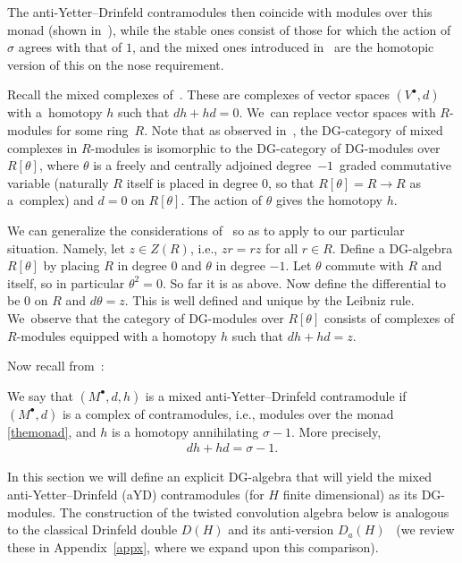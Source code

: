 \documentclass[11pt]{article}
\numberwithin{equation}{section}
\numberwithin{equation}{section}
\begin{document}
The anti-Yetter--Drinfeld contramodules then coincide with modules over this monad (shown in~\cite{chern}), while the stable ones consist of those for which the action of $\sigma$ agrees with that of $1$, and the mixed ones introduced in~\cite{chern} are the homotopic version of this on the nose requirement.

Recall the mixed complexes of~\cite{kassel}. These are complexes of vector spaces $(V^\bullet,d)$ with a~homo\-topy $h$ such that $dh+hd=0$. We~can replace vector spaces with $R$-modules for some ring~$R$. Note that as observed in~\cite{kassel}, the DG-category of mixed complexes in $R$-modules is isomorphic to the DG-category of DG-modules over $R[\theta]$, where $\theta$ is a freely and centrally adjoined degree~$-1$~graded commutative variable (naturally $R$ itself is placed in degree $0$, so that $R[\theta]=R\to R$ as a~comp\-lex) and $d=0$ on $R[\theta]$. The action of $\theta$ gives the homotopy $h$.

We can generalize the considerations of~\cite{kassel} so as to apply to our particular situation. Namely, let $z\in Z(R)$, i.e., $zr=rz$ for all $r\in R$. Define a DG-algebra $R[\theta]$ by placing $R$ in degree $0$ and $\theta$ in degree $-1$. Let $\theta$ commute with $R$ and itself, so in particular $\theta^2=0$. So far it is as above. Now define the differential to be $0$ on $R$ and $d\theta=z$. This is well defined and unique by the Leibniz rule. We~observe that the category of DG-modules over $R[\theta]$ consists of complexes of $R$-modules equipped with a homotopy $h$ such that $dh+hd=z$.

Now recall from~\cite{chern}:

\begin{Definition}
We say that $(M^\bullet,d,h)$ is a mixed anti-Yetter--Drinfeld contramodule if $(M^\bullet,d)$ is a complex of contramodules, i.e., modules over the monad \eqref{themonad}, and $h$ is a homotopy annihilating $\sigma-1$. More precisely,
\begin{gather}
dh+hd=\sigma-1.
\end{gather}
\end{Definition}

In this section we will define an explicit DG-algebra that will yield the mixed anti-Yetter--Drinfeld (aYD) contramodules (for $H$ finite dimensional) as its DG-modules. The construction of the twisted convolution algebra below is analogous to the classical Drinfeld double $D(H)$ and its anti-version $D_a(H)$~\cite{HKRS2} (we review these in Appendix~\ref{appx}, where we expand upon this comparison).
\end{document}
